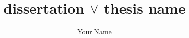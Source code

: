 \documentclass[]{ufdm}\sloppy
\title{dissertation $\vee$ thesis name}
\author{Your Name}
\begin{document}
\makeStart
\pagebreak




\appendix %

% 
% 
% 
\makeEnd
\end{document}
